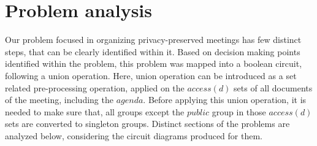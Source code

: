 \section{Problem analysis}
Our problem focused in organizing privacy-preserved meetings has few distinct steps, that can be clearly identified within it. Based on decision making points identified within the problem, this problem was mapped into a boolean circuit, following a union operation. Here, union operation can be introduced as a set related pre-processing operation, applied on the $access(d)$ sets of all documents of the meeting, including the $agenda$. Before applying this union operation, it is needed to make sure that, all groups except the $public$ group in those $access(d)$ sets are converted to singleton groups. Distinct sections of the problems are analyzed below, considering the circuit diagrams produced for them.\\ \\
